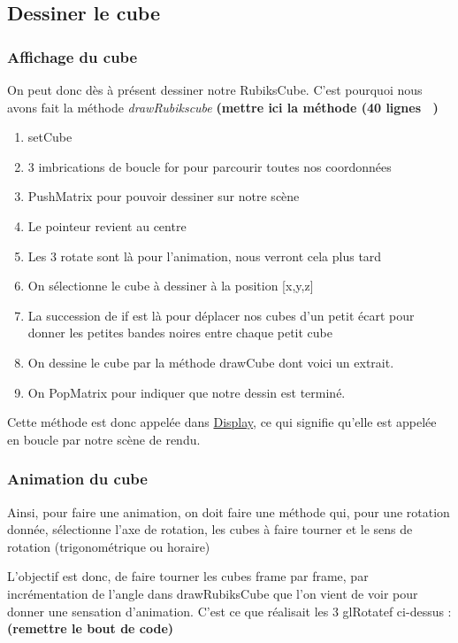 \subsection{Dessiner le cube}
\subsubsection{Affichage du cube}
On peut donc dès à présent dessiner notre RubiksCube. C’est pourquoi nous avons fait la méthode \textit{drawRubikscube} 
\textbf{(mettre ici la méthode (40 lignes ~)}

\begin{enumerate}
    \item setCube
    \item 3 imbrications de boucle for pour parcourir toutes nos coordonnées
    \item PushMatrix pour pouvoir dessiner sur notre scène
    \item Le pointeur revient au centre
    \item Les 3 rotate sont là pour l’animation, nous verront cela plus tard
    \item On sélectionne le cube à dessiner à la position [x,y,z]
    \item La succession de if est là pour déplacer nos cubes d’un petit écart pour donner les petites bandes noires entre chaque petit cube
    \item On dessine le cube par la méthode drawCube dont voici un extrait.
    \item On PopMatrix pour indiquer que notre dessin est terminé.
\end{enumerate}

Cette méthode est donc appelée dans \underline{Display}, ce qui signifie qu’elle est appelée en boucle par notre scène de rendu.

\subsubsection{Animation du cube}
Ainsi, pour faire une animation, on doit faire une méthode qui, pour une rotation donnée, sélectionne l’axe de rotation, les cubes à faire tourner et le sens de rotation (trigonométrique ou horaire)

L’objectif est donc, de faire tourner les cubes frame par frame, par incrémentation de l’angle dans drawRubiksCube que l’on vient de voir pour donner une sensation d’animation. C’est ce que réalisait les 3 glRotatef ci-dessus :  \textbf{(remettre le bout de code)}


